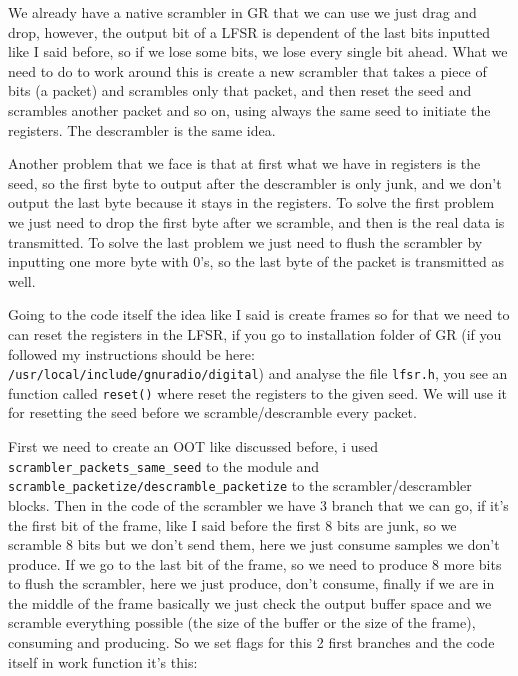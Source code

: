 \documentclass[a4paper, 10pt, conference]{ieeeconf}      %
\begin{document}
    
    We already have a native scrambler in GR that we can use we just drag and drop, however, the output bit of a LFSR is dependent of the last bits inputted like I said before, so if we lose some bits, we lose every single bit ahead. What we need to do to work around this is create a new scrambler that takes a piece of bits (a packet) and scrambles only that packet, and then reset the seed and scrambles another packet and so on, using always the same seed to initiate the registers. The descrambler is the same idea.
    
    Another problem that we face is that at first what we have in registers is the seed, so the first byte to output after the descrambler is only junk, and we don't output the last byte because it stays in the registers. To solve the first problem we just need to drop the first byte after we scramble, and then is the real data is transmitted. To solve the last problem we just need to flush the scrambler by inputting one more byte with 0's, so the last byte of the packet is transmitted as well.  
    
    Going to the code itself the idea like I said is create frames so for that we need to can reset the registers in the LFSR, if you go to installation folder of GR (if you followed my instructions should be here: \verb|/usr/local/include/gnuradio/digital|) and analyse the file \verb|lfsr.h|, you see an function called \verb|reset()| where reset the registers to the given seed. We will use it for resetting the seed before we scramble/descramble every packet.
    
    First we need to create an OOT like discussed before, i used \verb|scrambler_packets_same_seed| to the module and \verb|scramble_packetize/descramble_packetize| to the scrambler/descrambler blocks. Then in the code of the scrambler we have 3 branch that we can go, if it's the first bit of the frame, like I said before the first 8 bits are junk, so we scramble 8 bits but we don't send them, here we just consume samples we don't produce. If we go to the last bit of the frame, so we need to produce 8 more bits to flush the scrambler, here we just produce, don't consume, finally if we are in the middle of the frame basically we just check the output buffer space and we scramble everything possible (the size of the buffer or the size of the frame), consuming and producing.
    So we set flags for this 2 first branches and the code itself in work function it's this:
    
\end{document}
